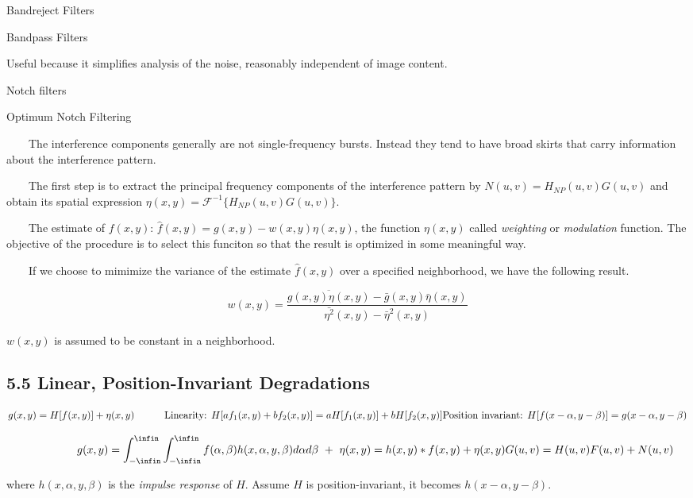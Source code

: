 \documentclass[]{article}
\begin{document}
Bandreject Filters

Bandpass Filters

Useful because it simplifies analysis of the noise, reasonably
independent of image content.

Notch filters

Optimum Notch Filtering

\(\quad\quad\)The interference components generally are not
single-frequency bursts. Instead they tend to have broad skirts that
carry information about the interference pattern.

\(\quad\quad\)The first step is to extract the principal frequency
components of the interference pattern by \(N(u,v)=H_{NP}(u,v)G(u,v)\)
and obtain its spatial expression
\(\eta(x,y)=\mathcal{F}^{-1}\{H_{NP}(u,v)G(u,v)\}\).

\(\quad\quad\)The estimate of \(f(x,y)\):
\(\hat{f}(x,y)=g(x,y)-w(x,y)\eta(x,y)\), the function \(\eta(x,y)\)
called \emph{weighting} or \emph{modulation} function. The objective of
the procedure is to select this funciton so that the result is optimized
in some meaningful way.

\(\quad\quad\)If we choose to mimimize the variance of the estimate
\(\hat{f}(x,y)\) over a specified neighborhood, we have the following
result.

\[w(x,y)=\dfrac{\overline{g(x,y)\eta(x,y)}-\bar{g}(x,y)\bar{\eta}(x,y)}{\bar{\eta^2}(x,y)-\bar{\eta}^2(x,y)}\]

\(w(x,y)\) is assumed to be constant in a neighborhood.

\subsection{5.5 Linear, Position-Invariant
Degradations}\label{header-n805}

\[g(x,y)=H[f(x,y)]+\eta(x,y)\\
\quad\quad\quad\text{Linearity:  } H[af_1(x,y)+bf_2(x,y)]=aH[f_1(x,y)]+bH[f_2(x,y)]\\
\text{Position invariant: } H[f(x-\alpha, y-\beta)]=g(x-\alpha, y-\beta)\]

\[\qquad \qquad \quad g(x,y)=\int^{\infin}_{-\infin}\int^{\infin}_{-\infin}f(\alpha,\beta)h(x,\alpha,y,\beta)d\alpha d\beta\ +\ \eta(x,y)\\
 = h(x,y)*f(x,y) + \eta(x,y)\\
 G(u,v)=H(u,v)F(u,v)+N(u,v)\]

where \(h(x,\alpha,y,\beta)\) is the \emph{impulse response} of \(H\).
Assume \(H\) is position-invariant, it becomes \(h(x-\alpha, y-\beta)\).
\end{document}

